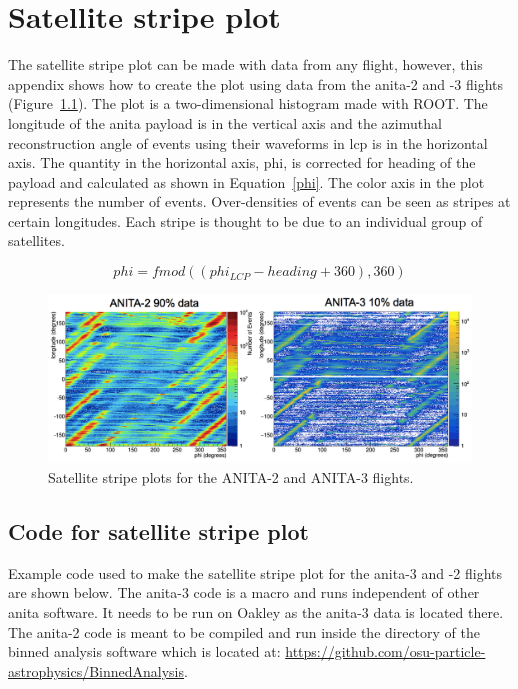 \chapter{Satellite stripe plot}

The satellite stripe plot can be made with data from any flight, however, this appendix shows how to create the plot using data from the \gls{anita}-2 and -3 flights (Figure~\ref{sat_stripe}). The plot is a two-dimensional histogram made with ROOT. The longitude of the \gls{anita} payload is in the vertical axis and the azimuthal reconstruction angle of events using their waveforms in \gls{lcp} is in the horizontal axis. The quantity in the horizontal axis, phi, is corrected for heading of the payload and calculated as shown in Equation~\ref{phi}. The color axis in the plot represents the number of events. Over-densities of events can be seen as stripes at certain longitudes. Each stripe is thought to be due to an individual group of satellites.

\begin{equation}
phi = fmod((phi_{LCP} - heading + 360),360)
\label{phi}
\end{equation}

\begin{figure}
\centering
\includegraphics[width=1.0\textwidth]{figures/same_stripes.png}
\caption{Satellite stripe plots for the ANITA-2 and ANITA-3 flights.}
\label{sat_stripe}
\end{figure}

\section{Code for satellite stripe plot}

Example code used to make the satellite stripe plot for the \gls{anita}-3 and -2 flights are shown below. The \gls{anita}-3 code is a macro and runs independent of other \gls{anita} software. It needs to be run on Oakley as the \gls{anita}-3 data is located there. The \gls{anita}-2 code is meant to be compiled and run inside the  directory of the binned analysis software which is located at:
\href{https://github.com/osu-particle-astrophysics/BinnedAnalysis}{https://github.com/osu-particle-astrophysics/BinnedAnalysis}. 

